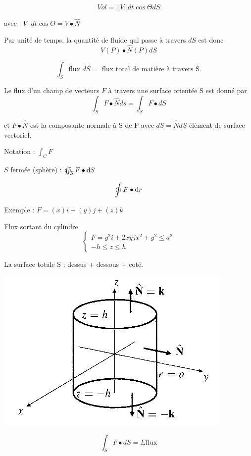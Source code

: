  \[Vol = ||V||dt \cos \Theta dS\]

 avec $||V||dt \cos \Theta = V\bullet \hat N$


 Par unité de temps, la quantité de fluide qui passe à travers $dS$ est donc \[V(P) \bullet \hat N(P) dS\]

 \[\int_S \text{flux } dS = \text{ flux total de matière à travers S.}\]

 \begin{mydef}
 Le flux d'un champ de vecteurs $F$  à travers une surface orientée S est donné par\[\int_S F \bullet \hat N ds = \int_S F \bullet dS\]

 et $F \bullet \hat N$ est la composante normale à S de F avec $dS = \hat N dS$ élément de surface vectoriel.

 Notation : $\int_C F$
 \end{mydef}

\begin{myrem}

$S$ fermée (sphère) :  $ \oiint_S F\bullet \operatorname{d}\! S$

\[\oint F\bullet \operatorname{d}\! r\]

\end{myrem}

Exemple : $F = (x) i + (y) j+(z) k$

Flux sortant du cylindre
\[\left\{
\begin{array}{c}
F=y^2i+2xyjx^2+y^2\leqslant a^2 \\
-h\leqslant z \leqslant h
\end{array}
\right.\]


La surface totale S : dessus + dessous + coté.

\includegraphics[scale=0.5]{image10.png}

\[\int_S F\bullet dS = \Sigma\text{flux}\]

